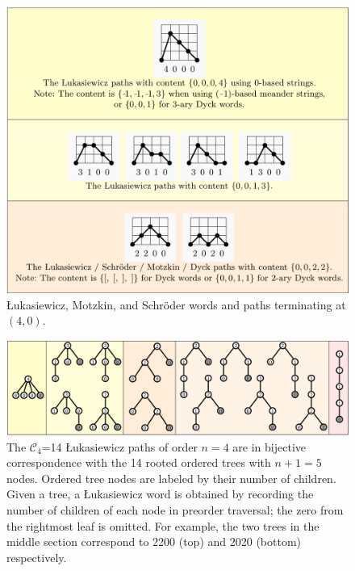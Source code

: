 \begin{figure}[]
	\centering
	\includegraphics[width = .95 \textwidth]{paths.png}
	\caption{Łukasiewicz, Motzkin, and Schröder words and paths terminating at $(4,0)$.}
	\label{fig:paths}
\end{figure}




\begin{figure}[]
	\centering
	\includegraphics[width = .95 \textwidth]{trees.png}
	\caption[The $\mathcal{C}_4$=14 Łukasiewicz paths of order $n=4$ are in bijective correspondence with the 14 rooted ordered trees with $n+1=5$ nodes.]{The $\mathcal{C}_4$=14 Łukasiewicz paths of order $n=4$ are in bijective correspondence with the 14 rooted ordered trees with $n+1=5$ nodes.  Ordered tree nodes are labeled by their number of children.  Given a tree, a Łukasiewicz word is obtained by recording the number of children of each node in preorder traversal; the zero from the rightmost leaf is omitted.  For example, the two trees in the middle section correspond to 2200 (top) and 2020 (bottom) respectively.}
	\label{fig:lukatrees}
\end{figure}


